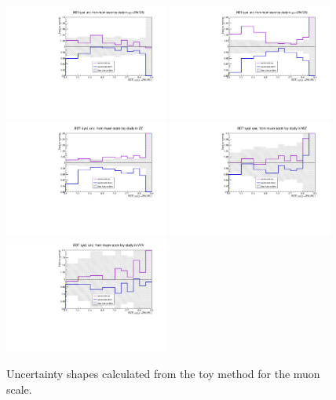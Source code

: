 \begin{figure}[htbp]
\begin{center}
\includegraphics[width=0.48\textwidth]{figures/syst_BDT_ZH_hinv_sm_toys_muon.pdf}
\includegraphics[width=0.48\textwidth]{figures/syst_BDT_ggZH_hinv_toys_muon.pdf}
\includegraphics[width=0.48\textwidth]{figures/syst_BDT_ZZ_toys_muon.pdf}
\includegraphics[width=0.48\textwidth]{figures/syst_BDT_WZ_toys_muon.pdf}
\includegraphics[width=0.48\textwidth]{figures/syst_BDT_VVV_toys_muon.pdf}
\caption{Uncertainty shapes calculated from the toy method for the muon scale.}
\label{fig:bdt_muon_scale}
\end{center}
\end{figure}

